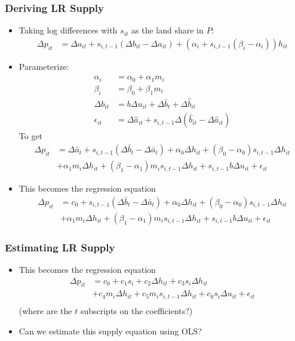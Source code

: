 \documentclass[english,xcolor=svgnames]{beamer}
\begin{document}
\begin{frame}
	\frametitle[alignment=center]{Deriving LR Supply}
	\begin{itemize}
		\item Taking log differences with $s_{it}$ as the land share in $P$:
		\begin{align*}
			\Delta p_{it} &= \Delta a_{it} + s_{i,t-1} (\Delta b_{it} - \Delta a_{it}) + (\alpha_i + s_{i,t-1}(\beta_i - \alpha_i))h_{it}
		\end{align*}
		\item Parameterize:
		\begin{align*}
			\alpha_i &= \alpha_0 + \alpha_1 m_i \\
			\beta_i &= \beta_0 + \beta_1 m_i \\
			\Delta b_{it} &= b \Delta u_{it} + \Delta\bar{b}_t + \Delta\hat{b}_{it} \\
			\epsilon_{it} &= \Delta\hat{a}_{it} + s_{i,t-1} \Delta(\hat{b}_{it} - \Delta\hat{a}_{it})
		\end{align*}
		To get
		\begin{align*}
			\Delta p_{it} &= \Delta \bar{a}_{t} + s_{i,t-1}(\Delta\bar{b}_t-\Delta\bar{a}_t) +\alpha_0 \Delta h_{it} + (\beta_0 - \alpha_0 )s_{i,t-1}\Delta h_{it}  \\
			&+  \alpha_1 m_i \Delta h_{it} + (\beta_1 - \alpha_1)m_i s_{i,t-1}\Delta h_{it}+ s_{i,t-1}b\Delta u_{it} + \epsilon_{it}
		\end{align*}
		\item This becomes the regression equation
		\begin{align*}
			\Delta p_{it} &= c_0 + s_{i,t-1}(\Delta\bar{b}_t-\Delta\bar{a}_t) +\alpha_0 \Delta h_{it} + (\beta_0 - \alpha_0 )s_{i,t-1}\Delta h_{it} \\
			&  +  \alpha_1 m_i \Delta h_{it} + (\beta_1 - \alpha_1)m_i s_{i,t-1}\Delta h_{it}+ s_{i,t-1}b\Delta u_{it} + \epsilon_{it}
		\end{align*}
	\end{itemize}
\end{frame}

\begin{frame}
	\frametitle[alignment=center]{Estimating LR Supply}
	\begin{itemize}
		\item This becomes the regression equation
		\begin{align*}
			\Delta p_{it} &= c_0 + c_1 s_{i}  + c_2 \Delta h_{it} + c_3 s_{i}\Delta h_{it} \\
			&  +  c_4 m_i \Delta h_{it} + c_5 m_i s_{i,t-1}\Delta h_{it}+ c_6 s_{i} \Delta u_{it} + \epsilon_{it} \\
		\end{align*}
		(where are the $t$ subscripts on the coefficients?)
		\item Can we estimate this supply equation using OLS?
		
	\end{itemize}
\end{frame}
\end{document}
